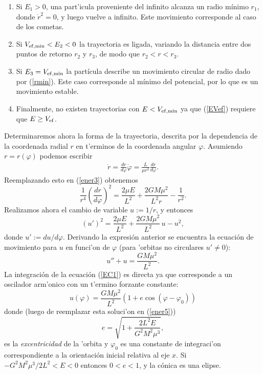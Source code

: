 \begin{enumerate}
\item Si $E_1>0$, una part'icula proveniente del infinito alcanza un radio
m\'inimo $r_1$, donde $\dot{r}^2=0$, y luego vuelve a infinito. Este movimiento corresponde al caso de los cometas.

\item Si $V_{\rm ef, min}<E_2<0$ la trayectoria es ligada, variando la distancia entre dos puntos de retorno $r_2$ y $r_3$, de modo que $r_2<r<r_{3}$.

\item Si $E_{3}=V_{\rm ef, min}$ la part\'icula
describe un movimiento circular de radio dado por (\ref{rmin}). Este caso
corresponde al m\'inimo del potencial, por lo que es un
movimiento estable.

\item Finalmente, no existen trayectorias con $E<V_{\rm ef, min}$ ya que (\ref{EVef}) requiere que $E\ge V_{\rm ef}$.
\end{enumerate}

Determinaremos ahora la forma de la trayectoria, descrita por la dependencia de la coordenada radial $r$ en t'erminos de la coordenada angular $\varphi$. Asumiendo $r=r(\varphi)$ podemos escribir
\begin{eqnarray}
\dot{r}=\frac{dr}{d\varphi}\dot{\varphi}=\frac{L}{\mu r^2}\frac{dr}{d\varphi}.
\end{eqnarray}
Reemplazando esto en (\ref{ener3}) obtenemos
\begin{equation}
\frac{1}{r^4}\left(\frac{dr}{d\varphi}\right)^2=\frac{2\mu E}{L^2}+\frac{2GM\mu^2}{L^2r}-\frac{1}{r^2}.\label{ener4}
\end{equation}
Realizamos ahora el cambio de variable $u:=1/r$, y entonces
\begin{equation}
(u')^2=\frac{2\mu E}{L^2}+\frac{2GM\mu^2}{L^2}\,u-u^{2
},\label{ener5}
\end{equation}
donde $u':=du/d\varphi$. Derivando la expresi\'on anterior se encuentra la ecuaci\'on de
movimiento para $u$ en funci'on de $\varphi$ (para 'orbitas no circulares $u'\neq 0$):
\begin{equation}
u''+u=\frac{GM\mu^2}{L^2}.\label{EC1}
\end{equation}
La integraci\'on de la ecuaci\'on (\ref{EC1}) es directa ya que corresponde a un oscilador arm'onico con un t'ermino forzante constante:
\begin{equation}
u(\varphi)=\frac{GM\mu^2}{L^2}\left(1+e\cos
(\varphi-\varphi_0)\right)\label{CON1}
\end{equation}
donde (luego de reemplazar esta soluci'on en (\ref{ener5}))
\begin{equation}
e=\sqrt{1+\frac{2L^2E}{G^2M^2\mu^3}}, \label{ex}
\end{equation}
es la \textit{excentricidad} de la 'orbita y $\varphi_0$ es una constante de
integraci'on correspondiente a la orientaci\'on inicial relativa al eje
$x$. Si $-G^2M^2\mu^3/2L^2<E<0$ entonces $0<e<1$, y la
c\'onica es una elipse.

